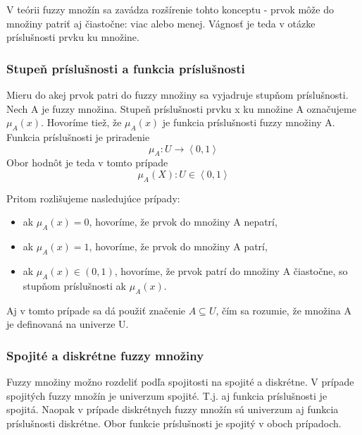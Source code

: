 V teórii fuzzy množín sa zavádza rozšírenie tohto konceptu - prvok môže do množiny patriť aj čiastočne: viac alebo menej. Vágnosť je teda v otázke príslušnosti prvku ku množine. \cite{gregorUI} 

\subsubsection{Stupeň príslušnosti a funkcia príslušnosti}
Mieru do akej prvok patri do fuzzy množiny sa vyjadruje stupňom príslušnosti. Nech A je fuzzy množina. Stupeň príslušnosti prvku x ku množine A označujeme $\mu_A\left( x\right) $. 
Hovoríme tiež, že $\mu_A\left( x\right) $ je funkcia príslušnosti fuzzy množiny A. \cite{gregorUI, gregorRef14} 
Funkcia príslušnosti je priradenie
\begin{equation}\label{funPrislus}
\mu_A : U \longrightarrow \left\langle 0, 1 \right\rangle 
\end{equation}
Obor hodnôt je teda v tomto prípade 
\begin{equation}\label{funPrislus}
\mu_A (X) : U \in \left\langle 0, 1 \right\rangle 
\end{equation}

Pritom rozlišujeme nasledujúce prípady: 
\begin{itemize}
	\item ak $\mu_A (x) = 0$, hovoríme, že prvok do množiny A nepatrí, 
	\item ak $\mu_A (x) = 1$, hovoríme, že prvok do množiny A patrí, 
	\item ak $\mu_A (x) \in (0, 1)$, hovoríme, že prvok patrí do množiny A čiastočne, so stupňom príslušnosti ak $\mu_A(x)$. 
\end{itemize}

Aj v tomto prípade sa dá použiť značenie $A\subseteq U$, čím sa rozumie, že množina A je definovaná na univerze U.  \cite{gregorUI} 

\subsubsection{Spojité a diskrétne fuzzy množiny}
Fuzzy množiny možno rozdeliť podľa spojitosti na spojité a diskrétne. V prípade spojitých fuzzy množín je univerzum spojité. T.j. aj funkcia príslušnosti je spojitá. Naopak v prípade diskrétnych fuzzy množín sú univerzum aj funkcia príslušnosti diskrétne. Obor funkcie príslušnosti je spojitý v oboch prípadoch.  \cite{gregorUI} 



